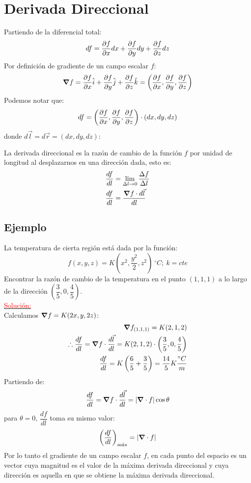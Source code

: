 \documentclass[../main]{subfiles}
\begin{document}
\section{Derivada Direccional}
Partiendo de la diferencial total:
\begin{equation}
    df=\pdv{f}{x}dx+\pdv{f}{y}dy+\pdv{f}{z}dz
\end{equation}
Por definición de gradiente de un campo escalar $f$:
\begin{equation}
    \grad{f}=\pdv{f}{x}\hat{i}+\pdv{f}{y}\hat{j}+\pdv{f}{z}\hat{k}=\left(\pdv{f}{x},\pdv{f}{y},\pdv{f}{z}\right)
\end{equation}
Podemos notar que:
\begin{equation}
    df=\left(\pdv{f}{x},\pdv{f}{y},\pdv{f}{z}\right) \cdot (dx,dy,dz)
\end{equation}
donde $d\vec{l}=d\vec{r}=(dx,dy,dz)$:
\begin{center}
\end{center}
La derivada direccional es la razón de cambio de la función $f$ por unidad de longitud al desplazarnos en una dirección dada, esto es:
\begin{align*}
    \dfrac{df}{dl}&=\lim_{\Delta l \rightarrow 0} \dfrac{\Delta f}{\Delta l} \\
    \dfrac{df}{dl}&=\dfrac{\grad{f}\cdot d \vec{l}}{dl}
\end{align*}
\begin{center}
\end{center}
\subsection*{Ejemplo}
La temperatura de cierta región está dada por la función:
$$
f(x,y,z)=K\left( x^2, \dfrac{y^2}{2}, z^2\right)\ ^{\circ}C; \ k=cte
$$
Encontrar la razón de cambio de la temperatura en el punto $(1,1,1)$ a lo largo de la dirección $\left(\dfrac{3}{5},0,\dfrac{4}{5}\right)$. \\
\underline{\textcolor{red}{Solución:}} \\
Calculamos $\grad{f}=K(2x,y,2z)$:
\begin{align*}
    \grad{f}_{(1,1,1)}=K(2,1,2) \\
    \therefore \dfrac{df}{dl}=\grad{f} \cdot \dfrac{d\vec{l}}{dl}=K(2,1,2)\cdot \left( \dfrac{3}{5},0,\dfrac{4}{5}\right) \\
    \dfrac{df}{dl}=K\left( \dfrac{6}{5}+\dfrac{3}{5}\right)= \dfrac{14}{5}K \dfrac{^{\circ}C}{m}
\end{align*}
Partiendo de:
$$
\dfrac{df}{dl}=\grad{f} \cdot \dfrac{d\vec{l}}{dl}=|\grad \cdot f| \cos{\theta}
$$
para $\theta=0$, $\dfrac{df}{dl}$ toma su mismo valor:
$$
\left( \dfrac{df}{dl} \right)_{\text{máx}}=|\grad \cdot f|
$$
Por lo tanto el gradiente de un campo escalar $f$, en cada punto del espacio es un vector cuya magnitud es el valor de la máxima derivada direccional y cuya dirección es aquella en que se obtiene la máxima derivada direccional.
\end{document}
